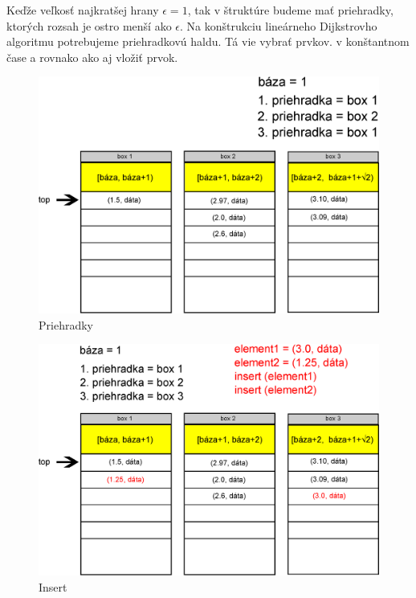 Keďže veľkosť najkratšej hrany $\epsilon = 1$, tak v štruktúre budeme mať priehradky, ktorých rozsah je ostro menší ako $\epsilon$.
Na konštrukciu lineárneho Dijkstrovho algoritmu potrebujeme priehradkovú haldu. Tá vie vybrať   prvkov.
v konštantnom čase a rovnako ako aj vložiť prvok.

\begin{figure}[h]
\centering
\includegraphics[width=\textwidth]{./img/priehradky_naplnene_default.eps}
\caption{Priehradky}
\label{fig:priehradky}
\end{figure}


\begin{figure}[h]
\centering
\includegraphics[width=\textwidth]{./img/priehradky_naplnene_default_i.eps}
\caption{Insert}
\label{fig:priehradky_i}
\end{figure}

